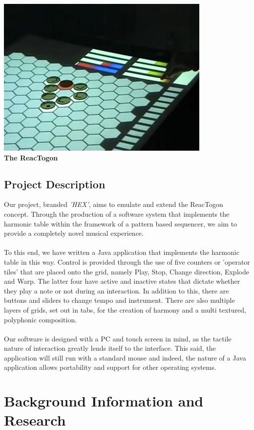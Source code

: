 \documentclass[10pt,a4paper]{article}
\begin{document}
\begin{center}
\includegraphics[scale=0.4]{1.jpg}\\
\textbf{The ReacTogon}
\end{center}

\subsection{Project Description}
Our project, branded \textit{'HEX'}, aims to emulate and extend the ReacTogon concept. Through the production of a software system that implements the harmonic table within the framework of a pattern based sequencer, we aim to provide a completely novel musical experience.\\
\\
To this end, we have written a Java application that implements the harmonic table in this way. Control is provided through the use of five counters or 'operator tiles' that are placed onto the grid, namely Play, Stop, Change direction, Explode and Warp. The latter four have active and inactive states that dictate whether they play a note or not during an interaction. In addition to this, there are buttons and sliders to change tempo and instrument. There are also multiple layers of grids, set out in tabs, for the creation of harmony and a multi textured, polyphonic composition.\\
\\
Our software is designed with a PC and touch screen in mind, as the tactile nature of interaction greatly lends itself to the interface. This said, the application will still run with a standard mouse and indeed, the nature of a Java application allows portability and support for other operating systems.

\pagebreak
\section{Background Information and Research}
\end{document}
